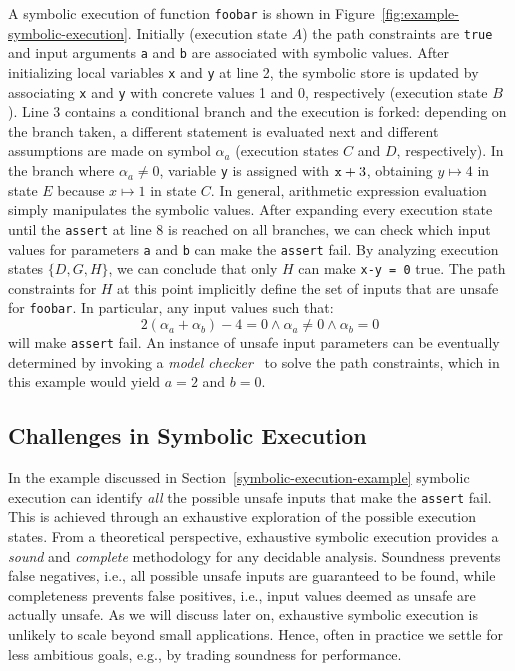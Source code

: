 \noindent A symbolic execution of function {\tt foobar} is shown in Figure~\ref{fig:example-symbolic-execution}. Initially (execution state $A$) the path constraints are {\tt true} and input arguments {\tt a} and {\tt b} are associated with symbolic values. 
After initializing local variables {\tt x} and {\tt y} at line 2, the symbolic store is updated by associating {\tt x} and {\tt y} with concrete values 1 and 0, respectively (execution state $B$). Line 3 contains a conditional branch and the execution is forked: depending on the branch taken, a different statement is evaluated next and different assumptions are made on symbol $\alpha_a$ (execution states $C$ and $D$, respectively). In the branch where $\alpha_a\neq 0$, variable {\tt y} is assigned with ${\tt x}+3$, obtaining $y\mapsto 4$ in state $E$ because $x\mapsto 1$ in state $C$. In general, arithmetic expression evaluation simply manipulates the symbolic values.
After expanding every execution state until the {\tt assert} at line 8 is reached on all branches, we can check which input values for parameters {\tt a} and {\tt b} can make the {\tt assert} fail. By analyzing execution states $\{D,G,H\}$, we can conclude that only $H$ can make {\tt x-y = 0} true. The path constraints for $H$ at this point implicitly define the set of inputs that are unsafe for {\tt foobar}. 
In particular, any input values such that:
 \[ 2(\alpha_a+\alpha_b)-4 = 0 \wedge \alpha_a \neq 0 \wedge \alpha_b = 0 \]
will make {\tt assert} fail. An instance of unsafe input parameters can be eventually determined by invoking a {\em model checker}~\cite{} to solve the path constraints, which in this example would yield $a = 2$ and $b = 0$. 


\subsection{Challenges in Symbolic Execution}
\label{example-discussion}

In the example discussed in Section~\ref{symbolic-execution-example} symbolic execution can identify {\em all} the possible unsafe inputs that make the {\tt assert} fail. This is achieved through an exhaustive exploration of the possible execution states. From a theoretical perspective, exhaustive symbolic execution provides a {\em sound} and {\em complete} methodology for any decidable analysis. Soundness prevents false negatives, i.e., all possible unsafe inputs are guaranteed to be found, while completeness prevents false positives, i.e.,  input values deemed as unsafe are actually unsafe. As we will discuss later on, exhaustive symbolic execution is unlikely to scale beyond small applications. Hence, often in practice we settle for less ambitious goals, e.g., by trading soundness for performance.

